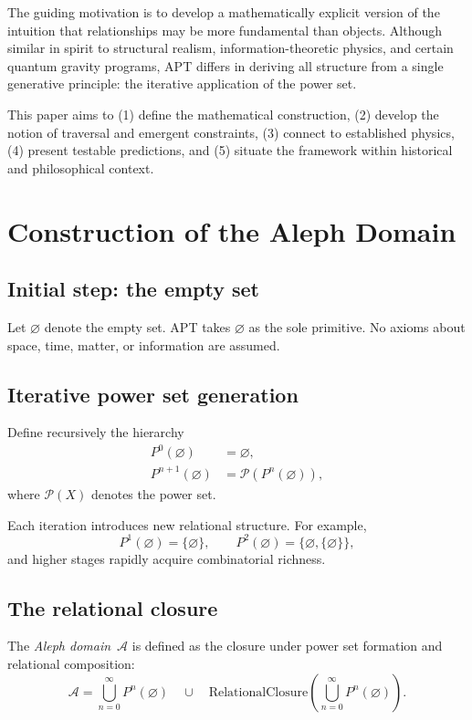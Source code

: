 \documentclass[12pt]{article}
\begin{document}
The guiding motivation is to develop a mathematically explicit version
of the intuition that relationships may be more fundamental than
objects. 
Although similar in spirit to structural realism, information-theoretic
physics, and certain quantum gravity programs, APT differs in deriving 
all structure from a single generative principle: the iterative
application of the power set.

This paper aims to (1) define the mathematical construction, 
(2) develop the notion of traversal and emergent constraints, 
(3) connect to established physics, 
(4) present testable predictions, and 
(5) situate the framework within historical and philosophical context.

\section{Construction of the Aleph Domain}

\subsection{Initial step: the empty set}

Let $\varnothing$ denote the empty set. 
APT takes $\varnothing$ as the sole primitive. 
No axioms about space, time, matter, or information are assumed.

\subsection{Iterative power set generation}

Define recursively the hierarchy
\begin{align}
P^0(\varnothing) &= \varnothing, \\
P^{n+1}(\varnothing) &= \mathcal{P}\!\left( P^n(\varnothing) \right),
\end{align}
where $\mathcal{P}(X)$ denotes the power set.

Each iteration introduces new relational structure.
For example,
\[
P^1(\varnothing) = \{\varnothing\}, \qquad
P^2(\varnothing) = \{\varnothing, \{\varnothing\}\},
\]
and higher stages rapidly acquire combinatorial richness.

\subsection{The relational closure}

The \emph{Aleph domain}~$\mathcal{A}$ is defined as the closure under 
power set formation and relational composition:
\begin{equation}
\mathcal{A}
= 
\bigcup_{n=0}^{\infty} P^n(\varnothing)
\quad \cup \quad
\mathrm{RelationalClosure}\left( \bigcup_{n=0}^{\infty} P^n(\varnothing) \right).
\end{equation}
\end{document}
